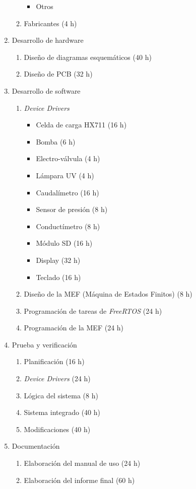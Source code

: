 \documentclass[
11pt, %
]{charter}
\begin{document}
\begin{enumerate}
\begin{enumerate}
\begin{itemize}
			\item Otros
		\end{itemize}
	\item Fabricantes (4 h)
	\end{enumerate}
\item Desarrollo de hardware
	\begin{enumerate}
	\item Diseño de diagramas esquemáticos (40 h)
	\item Diseño de PCB (32 h)
	\end{enumerate}
\item Desarrollo de software
	\begin{enumerate}
	\item \textit{Device Drivers}
		\begin{itemize}
			\item Celda de carga HX711 (16 h)
			\item Bomba (6 h)
			\item Electro-válvula (4 h)
			\item Lámpara UV (4 h)
			\item Caudalímetro (16 h)
			\item Sensor de presión (8 h)
			\item Conductímetro (8 h)
			\item Módulo SD (16 h)
			\item Display (32 h)
			\item Teclado (16 h)
		\end{itemize}
	\item Diseño de la MEF (Máquina de Estados Finitos) (8 h)
	\item Programación de tareas de \textit{FreeRTOS} (24 h)
	\item Programación de la MEF (24 h)
	\end{enumerate}
\item Prueba y verificación
	\begin{enumerate}
		\item Planificación (16 h)
		\item \textit{Device Drivers} (24 h)
		\item Lógica del sistema (8 h)
		\item Sistema integrado (40 h)
		\item Modificaciones (40 h)
	\end{enumerate}
\item Documentación
	\begin{enumerate}
		\item Elaboración del manual de uso (24 h)
		\item Elaboración del informe final (60 h)
	\end{enumerate}
\end{enumerate}
\end{document}
